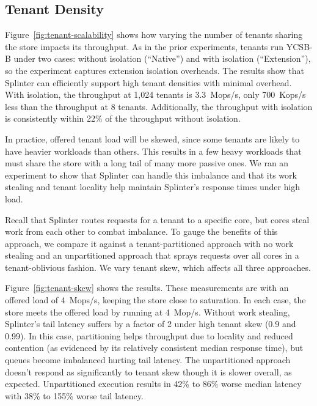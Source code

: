 \subsection{Tenant Density}

Figure~\ref{fig:tenant-scalability} shows how varying the number of tenants
  sharing the store impacts its throughput.
As in the prior experiments, tenants run YCSB-B under two cases:
without isolation (``Native'') and with isolation (``Extension''), so the
experiment captures extension isolation
  overheads.
The results show that Splinter can efficiently support high tenant densities
  with minimal overhead.
With isolation, the throughput at 1,024 tenants is 3.3~Mops/s, only
700~Kops/s less than the throughput at 8 tenants. Additionally,
the throughput with isolation is consistently within 22\% of the throughput
without isolation.

In practice, offered tenant load will be skewed, since some tenants are likely
  to have heavier workloads than others.
This results in a few heavy workloads that must share the store with a long
  tail of many more passive ones.
We ran an experiment to show that Splinter can handle this imbalance and
  that its work stealing and tenant locality help maintain Splinter's
  response times under high load.

Recall that Splinter routes requests for a tenant to a specific
  core, but cores steal work from each other to combat imbalance.
To gauge the benefits of this approach, we compare it against a tenant-partitioned
  approach with no work stealing and an unpartitioned approach that sprays
  requests over all cores in a tenant-oblivious fashion.
We vary tenant skew, which affects all three approaches.

Figure~\ref{fig:tenant-skew} shows the results.
These measurements are with an offered load of 4~Mops/s, keeping the
  store close to saturation.
In each case, the store meets the offered load by running at
  4~Mop/s.
Without work stealing, Splinter's tail latency suffers by a factor of 2 under
  high tenant skew (0.9 and 0.99).
In this case, partitioning helps throughput due to locality and reduced
  contention (as evidenced by its relatively consistent median response time),
  but queues become imbalanced hurting tail latency.
The unpartitioned approach doesn't respond as significantly to tenant skew
  though it is slower overall, as expected.
Unpartitioned execution results in
  42\% to 86\% worse median latency with 38\% to 155\% worse tail latency.

